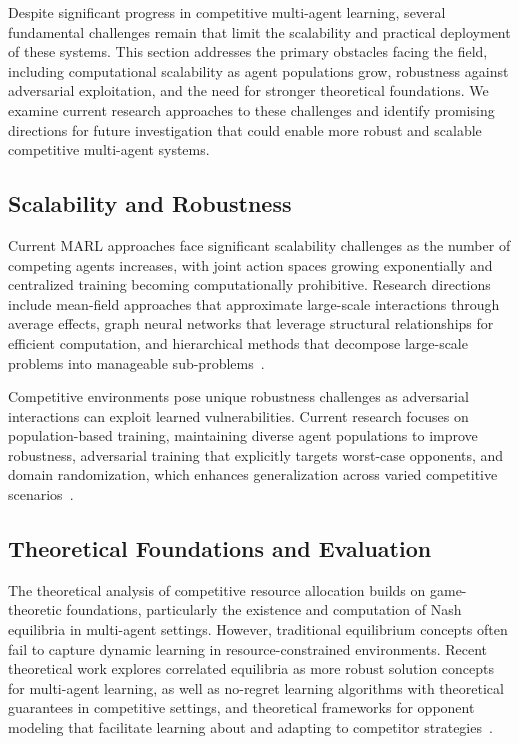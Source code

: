 Despite significant progress in competitive multi-agent learning, several fundamental challenges remain that limit the scalability and practical deployment of these systems. This section addresses the primary obstacles facing the field, including computational scalability as agent populations grow, robustness against adversarial exploitation, and the need for stronger theoretical foundations. We examine current research approaches to these challenges and identify promising directions for future investigation that could enable more robust and scalable competitive multi-agent systems.

\subsection{Scalability and Robustness}

Current MARL approaches face significant scalability challenges as the number of competing agents increases, with joint action spaces growing exponentially and centralized training becoming computationally prohibitive. Research directions include mean-field approaches that approximate large-scale interactions through average effects, graph neural networks that leverage structural relationships for efficient computation, and hierarchical methods that decompose large-scale problems into manageable sub-problems~\autocite{liu_scaling_2024, ma_efficient_2024}.

Competitive environments pose unique robustness challenges as adversarial interactions can exploit learned vulnerabilities. Current research focuses on population-based training, maintaining diverse agent populations to improve robustness, adversarial training that explicitly targets worst-case opponents, and domain randomization, which enhances generalization across varied competitive scenarios~\autocite{zhou_malib_2023}.

\subsection{Theoretical Foundations and Evaluation}

The theoretical analysis of competitive resource allocation builds on game-theoretic foundations, particularly the existence and computation of Nash equilibria in multi-agent settings. However, traditional equilibrium concepts often fail to capture dynamic learning in resource-constrained environments. Recent theoretical work explores correlated equilibria as more robust solution concepts for multi-agent learning, as well as no-regret learning algorithms with theoretical guarantees in competitive settings, and theoretical frameworks for opponent modeling that facilitate learning about and adapting to competitor strategies~\autocite{fuente_game_2024}.


